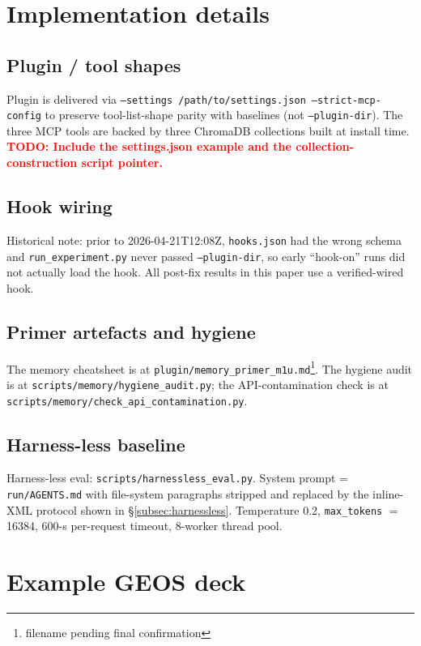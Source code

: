 \documentclass{article}
\newcommand{\todo}[1]{\textcolor{red}{\textbf{TODO: #1}}}
\begin{document}
\section{Implementation details}
\label{app:impl}

\subsection{Plugin / tool shapes}
Plugin is delivered via \texttt{--settings /path/to/settings.json --strict-mcp-config} to preserve tool-list-shape parity with baselines (not \texttt{--plugin-dir}). The three MCP tools are backed by three ChromaDB collections built at install time. \todo{Include the settings.json example and the collection-construction script pointer.}

\subsection{Hook wiring}
Historical note: prior to 2026-04-21T12:08Z, \texttt{hooks.json} had the wrong schema and \texttt{run\_experiment.py} never passed \texttt{--plugin-dir}, so early ``hook-on'' runs did not actually load the hook. All post-fix results in this paper use a verified-wired hook.

\subsection{Primer artefacts and hygiene}
The memory cheatsheet is at \texttt{plugin/memory\_primer\_m1u.md}\footnote{filename pending final confirmation}. The hygiene audit is at \texttt{scripts/memory/hygiene\_audit.py}; the API-contamination check is at \texttt{scripts/memory/check\_api\_contamination.py}.

\subsection{Harness-less baseline}
Harness-less eval: \texttt{scripts/harnessless\_eval.py}. System prompt = \texttt{run/AGENTS.md} with file-system paragraphs stripped and replaced by the inline-XML protocol shown in \S\ref{subsec:harnessless}. Temperature 0.2, \texttt{max\_tokens} $=$ 16384, 600-s per-request timeout, 8-worker thread pool.

\section{Example GEOS deck}
\label{app:geos-example}
\end{document}
